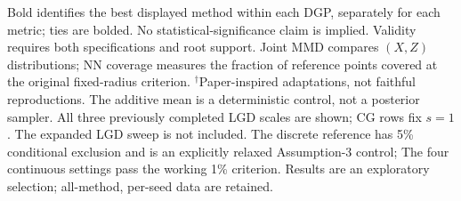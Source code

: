 \documentclass[11pt]{article}
\begin{document}
\begin{table}[t]
\begin{minipage}{\textwidth}\footnotesize
Bold identifies the best displayed method within each DGP, separately for each metric; ties are bolded. No statistical-significance claim is implied.
Validity requires both specifications and root support. Joint MMD compares $(X,Z)$ distributions; NN coverage measures the fraction of reference points covered at the original fixed-radius criterion.
$^{\dagger}$Paper-inspired adaptations, not faithful reproductions. The additive mean is a deterministic control, not a posterior sampler. All three previously completed LGD scales are shown; CG rows fix $s=1$. The expanded LGD sweep is not included.
The discrete reference has 5\% conditional exclusion and is an explicitly relaxed Assumption-3 control; The four continuous settings pass the working 1\% criterion. Results are an exploratory selection; all-method, per-seed data are retained.
\end{minipage}
\end{table}
\end{document}
